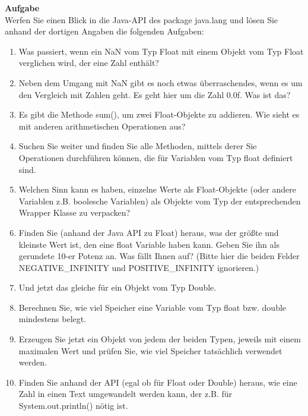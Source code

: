 \textbf{Aufgabe}\\

Werfen Sie einen Blick in die Java-API des package java.lang und lösen Sie anhand der dortigen Angaben die folgenden Aufgaben:

\begin{enumerate}
	
	\item Was passiert, wenn ein NaN vom Typ Float mit einem Objekt vom Typ Float verglichen wird, der eine Zahl enthält?
	
	\item Neben dem Umgang mit NaN gibt es noch etwas überraschendes, wenn es um den Vergleich mit Zahlen geht. Es geht hier um die Zahl 0.0f. Was ist das?
	
	\item Es gibt die Methode sum(), um zwei Float-Objekte zu addieren. Wie sieht es mit anderen arithmetischen Operationen aus?
	
	\item Suchen Sie weiter und finden Sie alle Methoden, mittels derer Sie Operationen durchführen können, die für Variablen vom Typ float definiert sind.
	
	\item Welchen Sinn kann es haben, einzelne Werte als Float-Objekte (oder andere Variablen z.B. boolesche Variablen) als Objekte vom Typ der entsprechenden Wrapper Klasse zu verpacken?
	
	\item Finden Sie (anhand der Java API zu Float) heraus, was der größte und kleinste Wert ist, den eine float Variable haben kann. Geben Sie ihn als gerundete 10-er Potenz an. Was fällt Ihnen auf? (Bitte hier die beiden Felder NEGATIVE\_INFINITY und POSITIVE\_INFINITY ignorieren.)
	
	\item Und jetzt das gleiche für ein Objekt vom Typ Double.
	
	\item Berechnen Sie, wie viel Speicher eine Variable vom Typ float bzw. double mindestens belegt.
	
	\item Erzeugen Sie jetzt ein Objekt von jedem der beiden Typen, jeweils mit einem maximalen Wert und prüfen Sie, wie viel Speicher tatsächlich verwendet werden.
	
	\item Finden Sie anhand der API (egal ob für Float oder Double) heraus, wie eine Zahl in einen Text umgewandelt werden kann, der z.B. für System.out.println() nötig ist.
	

\end{enumerate}
